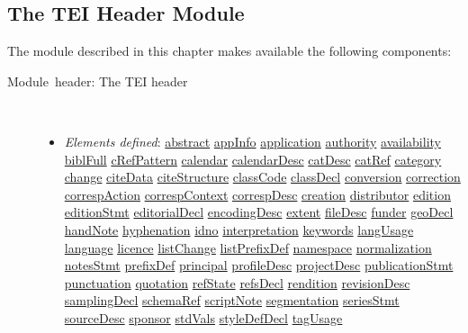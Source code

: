\subsection[{The TEI Header Module}]{The TEI Header Module}\par
The module described in this chapter makes available the following components: \begin{description}

\item[{Module header: The TEI header}]\hspace{1em}\hfill\linebreak
\mbox{}\\[-10pt] \begin{itemize}
\item {\itshape Elements defined}: \hyperref[TEI.abstract]{abstract} \hyperref[TEI.appInfo]{appInfo} \hyperref[TEI.application]{application} \hyperref[TEI.authority]{authority} \hyperref[TEI.availability]{availability} \hyperref[TEI.biblFull]{biblFull} \hyperref[TEI.cRefPattern]{cRefPattern} \hyperref[TEI.calendar]{calendar} \hyperref[TEI.calendarDesc]{calendarDesc} \hyperref[TEI.catDesc]{catDesc} \hyperref[TEI.catRef]{catRef} \hyperref[TEI.category]{category} \hyperref[TEI.change]{change} \hyperref[TEI.citeData]{citeData} \hyperref[TEI.citeStructure]{citeStructure} \hyperref[TEI.classCode]{classCode} \hyperref[TEI.classDecl]{classDecl} \hyperref[TEI.conversion]{conversion} \hyperref[TEI.correction]{correction} \hyperref[TEI.correspAction]{correspAction} \hyperref[TEI.correspContext]{correspContext} \hyperref[TEI.correspDesc]{correspDesc} \hyperref[TEI.creation]{creation} \hyperref[TEI.distributor]{distributor} \hyperref[TEI.edition]{edition} \hyperref[TEI.editionStmt]{editionStmt} \hyperref[TEI.editorialDecl]{editorialDecl} \hyperref[TEI.encodingDesc]{encodingDesc} \hyperref[TEI.extent]{extent} \hyperref[TEI.fileDesc]{fileDesc} \hyperref[TEI.funder]{funder} \hyperref[TEI.geoDecl]{geoDecl} \hyperref[TEI.handNote]{handNote} \hyperref[TEI.hyphenation]{hyphenation} \hyperref[TEI.idno]{idno} \hyperref[TEI.interpretation]{interpretation} \hyperref[TEI.keywords]{keywords} \hyperref[TEI.langUsage]{langUsage} \hyperref[TEI.language]{language} \hyperref[TEI.licence]{licence} \hyperref[TEI.listChange]{listChange} \hyperref[TEI.listPrefixDef]{listPrefixDef} \hyperref[TEI.namespace]{namespace} \hyperref[TEI.normalization]{normalization} \hyperref[TEI.notesStmt]{notesStmt} \hyperref[TEI.prefixDef]{prefixDef} \hyperref[TEI.principal]{principal} \hyperref[TEI.profileDesc]{profileDesc} \hyperref[TEI.projectDesc]{projectDesc} \hyperref[TEI.publicationStmt]{publicationStmt} \hyperref[TEI.punctuation]{punctuation} \hyperref[TEI.quotation]{quotation} \hyperref[TEI.refState]{refState} \hyperref[TEI.refsDecl]{refsDecl} \hyperref[TEI.rendition]{rendition} \hyperref[TEI.revisionDesc]{revisionDesc} \hyperref[TEI.samplingDecl]{samplingDecl} \hyperref[TEI.schemaRef]{schemaRef} \hyperref[TEI.scriptNote]{scriptNote} \hyperref[TEI.segmentation]{segmentation} \hyperref[TEI.seriesStmt]{seriesStmt} \hyperref[TEI.sourceDesc]{sourceDesc} \hyperref[TEI.sponsor]{sponsor} \hyperref[TEI.stdVals]{stdVals} \hyperref[TEI.styleDefDecl]{styleDefDecl} \hyperref[TEI.tagUsage]{tagUsage} 
\end{itemize}
\end{description}
